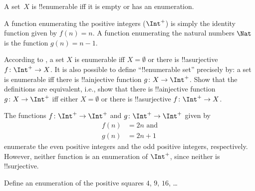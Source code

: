\documentclass[../../../include/open-logic-section]{subfiles}
\begin{document}
\begin{defn}
  A set~$X$ is !!{enumerable} iff it is empty or has an enumeration.
\end{defn}

\begin{ex}
A function enumerating the positive integers ($\Int^+$) is simply the
identity function given by $f(n) = n$. A function enumerating the
natural numbers $\Nat$ is the function $g(n) = n - 1$.
\end{ex}

\begin{prob}
  According to , a set $X$ is enumerable iff $X
  = \emptyset$ or there is !!a{surjective} $f\colon \Int^+ \to X$.  It
  is also possible to define ``!!{enumerable} set'' precisely by: a
  set is enumerable iff there is !!a{injective} function $g\colon X
  \to \Int^+$.  Show that the definitions are equivalent, i.e., show
  that there is !!a{injective} function $g\colon X \to \Int^+$ iff
  either $X = \emptyset$ or there is !!a{surjective} $f\colon \Int^+
  \to X$.
\end{prob}

\begin{ex}
The functions $f\colon \Int^+ \to \Int^+$ and $g \colon \Int^+ \to
\Int^+$ given by
\begin{align*}
f(n) & = 2n \text{ and}\\
g(n) & = 2n+1
\end{align*}
enumerate the even positive integers and the odd positive integers,
respectively. However, neither function is an enumeration of
$\Int^+$, since neither is !!{surjective}.
\end{ex}

\begin{prob}
Define an enumeration of the positive squares $4$, $9$, $16$, \dots
\end{prob}
\end{document}
